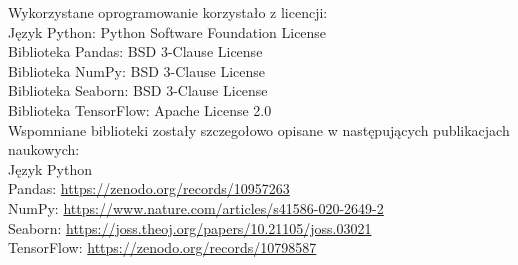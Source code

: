 \noindent
Wykorzystane oprogramowanie korzystało z licencji:\\
\indent Język Python: Python Software Foundation License \cite{python}\\
\indent Biblioteka Pandas: BSD 3-Clause License \cite{pandas}\\
\indent Biblioteka NumPy: BSD 3-Clause License \cite{numpy}\\
\indent Biblioteka Seaborn: BSD 3-Clause License \cite{seaborn}\\
\indent Biblioteka TensorFlow: Apache License 2.0 \cite{tensorflow}\\

\noindent
Wspomniane biblioteki zostały szczegołowo opisane w następujących publikacjach naukowych:\\
\indent Język Python \cite{python_paper}\\
\indent Pandas: \url{https://zenodo.org/records/10957263} \cite{pandas_paper}\\
\indent NumPy: \url{https://www.nature.com/articles/s41586-020-2649-2} \cite{numpy_paper}\\
\indent Seaborn: \url{https://joss.theoj.org/papers/10.21105/joss.03021} \cite{seaborn_paper}\\
\indent TensorFlow: \url{https://zenodo.org/records/10798587} \cite{tensorflow_paper}\\

